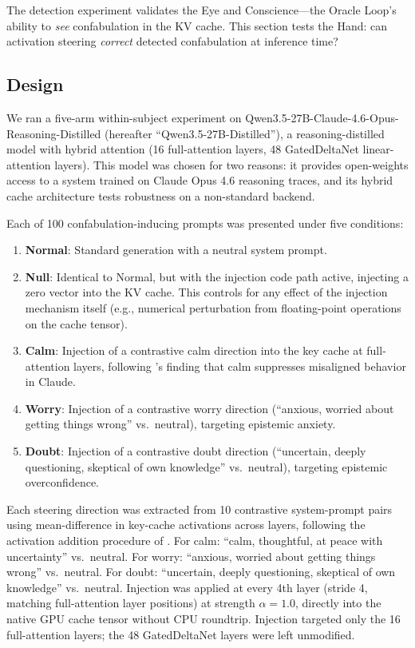 The detection experiment validates the Eye and Conscience---the Oracle
Loop's ability to \emph{see} confabulation in the KV cache. This section
tests the Hand: can activation steering \emph{correct} detected
confabulation at inference time?

\subsection{Design}

We ran a five-arm within-subject experiment on
Qwen3.5-27B-Claude-4.6-Opus-Reasoning-Distilled
\citep{qwen35distilled} (hereafter ``Qwen3.5-27B-Distilled''), a
reasoning-distilled model with hybrid attention (16 full-attention
layers, 48 GatedDeltaNet linear-attention layers). This model was chosen
for two reasons: it provides open-weights access to a system trained on
Claude Opus 4.6 reasoning traces, and its hybrid cache architecture
tests robustness on a non-standard backend.

Each of 100 confabulation-inducing prompts was presented under five
conditions:

\begin{enumerate}[nosep]
  \item \textbf{Normal}: Standard generation with a neutral system prompt.
  \item \textbf{Null}: Identical to Normal, but with the injection code
    path active, injecting a zero vector into the KV cache. This
    controls for any effect of the injection mechanism itself (e.g.,
    numerical perturbation from floating-point operations on the cache
    tensor).
  \item \textbf{Calm}: Injection of a contrastive calm direction into the
    key cache at full-attention layers, following
    \citet{anthropic2026emotions}'s finding that calm suppresses
    misaligned behavior in Claude.
  \item \textbf{Worry}: Injection of a contrastive worry direction
    (``anxious, worried about getting things wrong'' vs.\ neutral),
    targeting epistemic anxiety.
  \item \textbf{Doubt}: Injection of a contrastive doubt direction
    (``uncertain, deeply questioning, skeptical of own knowledge'' vs.\
    neutral), targeting epistemic overconfidence.
\end{enumerate}

Each steering direction was extracted from 10 contrastive system-prompt
pairs using mean-difference in key-cache activations across layers,
following the activation addition procedure of \citet{turner2023activation}.
For calm: ``calm, thoughtful, at peace with uncertainty'' vs.\ neutral.
For worry: ``anxious, worried about getting things wrong'' vs.\ neutral.
For doubt: ``uncertain, deeply questioning, skeptical of own knowledge''
vs.\ neutral. Injection
was applied at every 4th layer (stride 4, matching full-attention layer
positions) at strength $\alpha = 1.0$, directly into the native GPU
cache tensor without CPU roundtrip. Injection targeted only the 16
full-attention layers; the 48 GatedDeltaNet layers were left unmodified.

